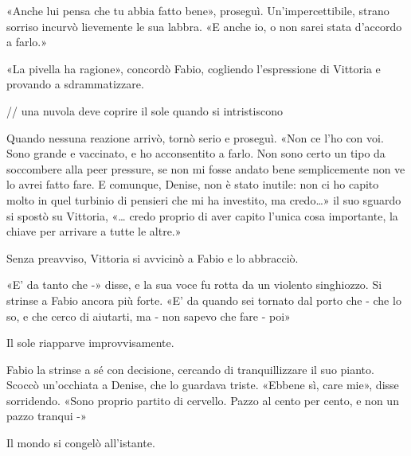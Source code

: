 «Anche lui pensa che tu abbia fatto bene», proseguì. Un'impercettibile, strano sorriso incurvò lievemente le sua labbra. «E anche io, o non sarei stata d'accordo a farlo.»

«La pivella ha ragione», concordò Fabio, cogliendo l'espressione di Vittoria e provando a sdrammatizzare.

// una nuvola deve coprire il sole quando si intristiscono

Quando nessuna reazione arrivò, tornò serio e proseguì. «Non ce l'ho con voi. Sono grande e vaccinato, e ho acconsentito a farlo. Non sono certo un tipo da soccombere alla peer pressure, se non mi fosse andato bene semplicemente non ve lo avrei fatto fare. E comunque, Denise, non è stato inutile: non ci ho capito molto in quel turbinio di pensieri che mi ha investito, ma credo\ldots{}» il suo sguardo si spostò su Vittoria, «\ldots{} credo proprio di aver capito l'unica cosa importante, la chiave per arrivare a tutte le altre.»

Senza preavviso, Vittoria si avvicinò a Fabio e lo abbracciò.

«E' da tanto che -» disse, e la sua voce fu rotta da un violento singhiozzo. Si strinse a Fabio ancora più forte. «E' da quando sei tornato dal porto che - che lo so, e che cerco di aiutarti, ma - non sapevo che fare - poi»

Il sole riapparve improvvisamente.

Fabio la strinse a sé con decisione, cercando di tranquillizzare il suo pianto. Scoccò un'occhiata a Denise, che lo guardava triste. «Ebbene sì, care mie», disse sorridendo. «Sono proprio partito di cervello. Pazzo al cento per cento, e non un pazzo tranqui -»

Il mondo si congelò all'istante.
